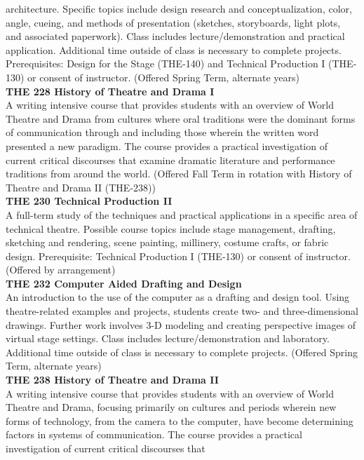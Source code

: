 \documentclass[
  letterpaper,
]{scrbook}
\begin{document}
architecture. Specific topics include design research and
conceptualization, color, angle, cueing, and methods of presentation
(sketches, storyboards, light plots, and associated paperwork). Class
includes lecture/demonstration and practical application. Additional
time outside of class is necessary to complete projects. Prerequisites:
Design for the Stage (THE-140) and Technical Production I (THE-130) or
consent of instructor. (Offered Spring Term, alternate years)\\
\textbf{THE 228 History of Theatre and Drama I}\\
A writing intensive course that provides students with an overview of
World Theatre and Drama from cultures where oral traditions were the
dominant forms of communication through and including those wherein the
written word presented a new paradigm. The course provides a practical
investigation of current critical discourses that examine dramatic
literature and performance traditions from around the world. (Offered
Fall Term in rotation with History of Theatre and Drama II (THE-238))\\
\textbf{THE 230 Technical Production II}\\
A full-term study of the techniques and practical applications in a
specific area of technical theatre. Possible course topics include stage
management, drafting, sketching and rendering, scene painting,
millinery, costume crafts, or fabric design. Prerequisite: Technical
Production I (THE-130) or consent of instructor. (Offered by
arrangement)\\
\textbf{THE 232 Computer Aided Drafting and Design}\\
An introduction to the use of the computer as a drafting and design
tool. Using theatre-related examples and projects, students create two-
and three-dimensional drawings. Further work involves 3-D modeling and
creating perspective images of virtual stage settings. Class includes
lecture/demonstration and laboratory. Additional time outside of class
is necessary to complete projects. (Offered Spring Term, alternate
years)\\
\textbf{THE 238 History of Theatre and Drama II}\\
A writing intensive course that provides students with an overview of
World Theatre and Drama, focusing primarily on cultures and periods
wherein new forms of technology, from the camera to the computer, have
become determining factors in systems of communication. The course
provides a practical investigation of current critical discourses that
\end{document}
